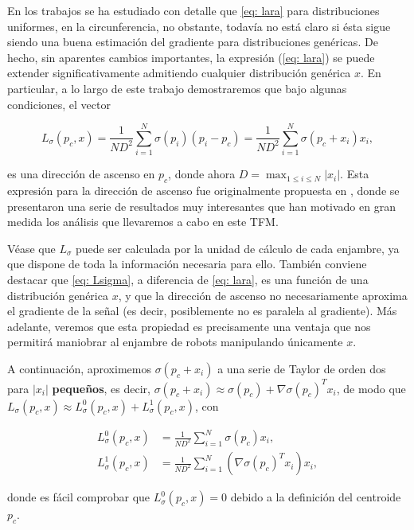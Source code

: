 En los trabajos \cite{brinon2015distributed,brinon2019multirobot} se ha estudiado con detalle que \eqref{eq: lara} para distribuciones uniformes, en la circunferencia, no obstante, todavía no está claro si ésta sigue siendo una buena estimación del gradiente  para distribuciones genéricas. De hecho, sin aparentes cambios importantes, la expresión (\ref{eq: lara}) se puede extender significativamente admitiendo cualquier distribución genérica $x$. En particular, a lo largo de este trabajo demostraremos que bajo algunas condiciones, el vector

\begin{equation} \label{eq: Lsigma}
L_\sigma(p_c,x) = \frac{1}{ND^2}\sum_{i=1}^N \sigma(p_i)(p_i - p_c) = \frac{1}{ND^2}\sum_{i=1}^N \sigma(p_c + x_i)x_i,
\end{equation}

es una dirección de ascenso en $p_c$, donde ahora $D = \max_{1\leq i\leq N}{|x_i|}$. Esta expresión para la dirección de ascenso fue originalmente propuesta en \cite{tfg_antonio}, donde se presentaron una serie de resultados muy interesantes que han motivado en gran medida los análisis que llevaremos a cabo en este TFM.

Véase que $L_\sigma$ puede ser calculada por la unidad de cálculo de cada enjambre, ya que dispone de toda la información necesaria para ello. También conviene destacar que \eqref{eq: Lsigma}, a diferencia de \eqref{eq: lara}, es una función de una distribución genérica $x$, y que la dirección de ascenso no necesariamente aproxima el gradiente de la señal (es decir, posiblemente no es paralela al gradiente). Más adelante, veremos que esta propiedad es precisamente una ventaja que nos permitirá maniobrar al enjambre de robots manipulando únicamente $x$.

A continuación, aproximemos $\sigma(p_c + x_i)$ a una serie de Taylor de orden dos para $|x_{i}|$ \textbf{pequeños}, es decir, $\sigma(p_c + x_i) \approx \sigma(p_c) + \nabla\sigma(p_c)^Tx_i$, de modo que $L_\sigma(p_c,x) \approx L_\sigma^0(p_c,x) + L_\sigma^1(p_c,x)$, con


\begin{align} \label{eq: L1.1}
    L^0_\sigma(p_c,x) &= \frac{1}{ND^2}\sum_{i=1}^N \sigma(p_c) x_i, \nonumber \\
    L^1_\sigma(p_c,x) &= \frac{1}{ND^2}\sum_{i=1}^N \left(\nabla\sigma(p_c)^Tx_i\right)x_i, 
\end{align}



donde es fácil comprobar que $L^0_\sigma(p_c,x) = 0$ debido a la definición del centroide $p_c$.

